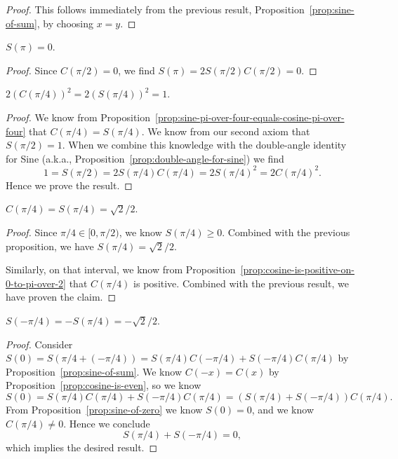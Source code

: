 \begin{proof}
  This follows immediately from the previous result, Proposition~\ref{prop:sine-of-sum}, by choosing $x=y$.
\end{proof}

\begin{proposition}
$S(\pi) = 0$.
\end{proposition}

\begin{proof}
  Since $C(\pi/2)=0$, we find $S(\pi)=2S(\pi/2)C(\pi/2)=0$.
\end{proof}

\begin{proposition}
$2(C(\pi/4))^{2} = 2(S(\pi/4))^{2} = 1$.
\end{proposition}
\begin{proof}
We know from Proposition~\ref{prop:sine-pi-over-four-equals-cosine-pi-over-four}
that $C(\pi/4)=S(\pi/4)$. We know from our second axiom that $S(\pi/2)=1$.
When we combine this knowledge with the double-angle identity for Sine
(a.k.a., Proposition~\ref{prop:double-angle-for-sine}) we find
\begin{equation}
1 = S(\pi/2) = 2S(\pi/4)C(\pi/4) = 2S(\pi/4)^{2} = 2C(\pi/4)^{2}.
\end{equation}
Hence we prove the result.
\end{proof}

\begin{proposition}\label{prop:sine-of-pi-over-four}
$C(\pi/4) = S(\pi/4) = \sqrt{2}/2$.
\end{proposition}

\begin{proof}
Since $\pi/4\in[0,\pi/2)$, we know $S(\pi/4)\geq 0$. Combined with the
  previous proposition, we have $S(\pi/4) = \sqrt{2}/2$.

Similarly, on that interval, we know from Proposition~\ref{prop:cosine-is-positive-on-0-to-pi-over-2}
that $C(\pi/4)$ is positive. Combined with the previous result, we have
proven the claim.
\end{proof}

\begin{proposition}
$S(-\pi/4) = -S(\pi/4) = -\sqrt{2}/2$.
\end{proposition}
\begin{proof}
  Consider $S(0) = S(\pi/4 + (-\pi/4)) = S(\pi/4)C(-\pi/4) + S(-\pi/4)C(\pi/4)$
  by Proposition~\ref{prop:sine-of-sum}.
  We know $C(-x)=C(x)$ by Proposition~\ref{prop:cosine-is-even}, so we
  know
  \begin{equation}
S(0) = S(\pi/4)C(\pi/4) + S(-\pi/4)C(\pi/4) = (S(\pi/4) + S(-\pi/4))C(\pi/4).
  \end{equation}
  From Proposition~\ref{prop:sine-of-zero} we know $S(0)=0$, and we know
  $C(\pi/4)\neq 0$. Hence we conclude
  \begin{equation}
S(\pi/4) + S(-\pi/4) = 0,
  \end{equation}
  which implies the desired result.
\end{proof}

